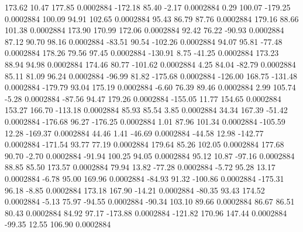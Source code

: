       173.62       10.47      177.85     0.0002884
     -172.18       85.40       -2.17     0.0002884
        0.29      100.07     -179.25     0.0002884
      100.09       94.91      102.65     0.0002884
       95.43       86.79       87.76     0.0002884
      179.16       88.66      101.38     0.0002884
      173.90      170.99      172.06     0.0002884
       92.42       76.22      -90.93     0.0002884
       87.12       90.70       98.16     0.0002884
      -83.51       90.54     -102.26     0.0002884
       94.07       95.81      -77.48     0.0002884
      178.26       79.56       97.45     0.0002884
     -130.91        8.75      -41.25     0.0002884
      173.23       88.94       94.98     0.0002884
      174.46       80.77     -101.62     0.0002884
        4.25       84.04      -82.79     0.0002884
       85.11       81.09       96.24     0.0002884
      -96.99       81.82     -175.68     0.0002884
     -126.00      168.75     -131.48     0.0002884
     -179.79       93.04      175.19     0.0002884
       -6.60       76.39       89.46     0.0002884
        2.99      105.74       -5.28     0.0002884
      -87.56       94.47      179.26     0.0002884
     -155.05       11.77      154.65     0.0002884
      153.27      166.70     -113.18     0.0002884
       85.93       85.54        3.85     0.0002884
       34.34      167.39      -51.42     0.0002884
     -176.68       96.27     -176.25     0.0002884
        1.01       87.96      101.34     0.0002884
     -105.59       12.28     -169.37     0.0002884
       44.46        1.41      -46.69     0.0002884
      -44.58       12.98     -142.77     0.0002884
     -171.54       93.77       77.19     0.0002884
      179.64       85.26      102.05     0.0002884
      177.68       90.70       -2.70     0.0002884
      -91.94      100.25       94.05     0.0002884
       95.12       10.87      -97.16     0.0002884
       88.85       85.50      173.57     0.0002884
       79.94       13.82      -77.28     0.0002884
       -5.72       95.28       13.17     0.0002884
       -6.78       95.00      169.96     0.0002884
      -84.93       91.32     -100.86     0.0002884
     -175.31       96.18       -8.85     0.0002884
      173.18      167.90      -14.21     0.0002884
      -80.35       93.43      174.52     0.0002884
       -5.13       75.97      -94.55     0.0002884
      -90.34      103.10       89.66     0.0002884
       86.67       86.51       80.43     0.0002884
       84.92       97.17     -173.88     0.0002884
     -121.82      170.96      147.44     0.0002884
      -99.35       12.55      106.90     0.0002884
